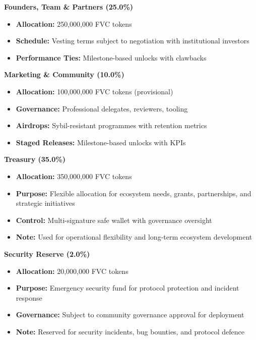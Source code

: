 \documentclass[
  paper=a4,
  ,captions=tableheading
]{scrartcl}
\providecommand{\tightlist}{%
  \setlength{\itemsep}{0pt}\setlength{\parskip}{0pt}}
\begin{document}
\textbf{Founders, Team \& Partners (25.0\%)}

\begin{itemize}
\tightlist
\item
  \textbf{Allocation:} 250,000,000 FVC tokens
\item
  \textbf{Schedule:} Vesting terms subject to negotiation with institutional investors
\item
  \textbf{Performance Ties:} Milestone-based unlocks with clawbacks
\end{itemize}

\textbf{Marketing \& Community (10.0\%)}

\begin{itemize}
\tightlist
\item
  \textbf{Allocation:} 100,000,000 FVC tokens (provisional)
\item
  \textbf{Governance:} Professional delegates, reviewers, tooling
\item
  \textbf{Airdrops:} Sybil-resistant programmes with retention metrics
\item
  \textbf{Staged Releases:} Milestone-based unlocks with KPIs
\end{itemize}

\textbf{Treasury (35.0\%)}

\begin{itemize}
\tightlist
\item
  \textbf{Allocation:} 350,000,000 FVC tokens
\item
  \textbf{Purpose:} Flexible allocation for ecosystem needs, grants, partnerships, and strategic initiatives
\item
  \textbf{Control:} Multi-signature safe wallet with governance oversight
\item
  \textbf{Note:} Used for operational flexibility and long-term ecosystem development
\end{itemize}

\textbf{Security Reserve (2.0\%)}

\begin{itemize}
\tightlist
\item
  \textbf{Allocation:} 20,000,000 FVC tokens
\item
  \textbf{Purpose:} Emergency security fund for protocol protection and incident response
\item
  \textbf{Governance:} Subject to community governance approval for deployment
\item
  \textbf{Note:} Reserved for security incidents, bug bounties, and protocol defence
\end{itemize}
\end{document}
